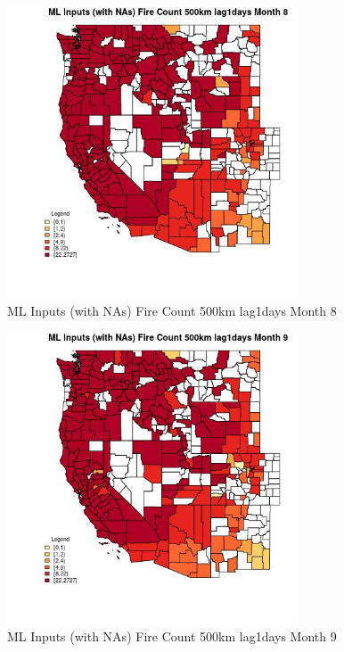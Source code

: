 \begin{figure} 
\centering  
\includegraphics[width=0.77\textwidth]{Code_Outputs/Report_ML_input_PM25_Step4_part_f_de_duplicated_aves_prioritize_24hr_obswNAs_CountyFire_Count_500km_lag1daysmedianMonth8.jpg} 
\caption{\label{fig:Report_ML_input_PM25_Step4_part_f_de_duplicated_aves_prioritize_24hr_obswNAsCountyFire_Count_500km_lag1daysmedianMonth8}ML Inputs (with NAs) Fire Count 500km lag1days Month 8} 
\end{figure} 
 

\begin{figure} 
\centering  
\includegraphics[width=0.77\textwidth]{Code_Outputs/Report_ML_input_PM25_Step4_part_f_de_duplicated_aves_prioritize_24hr_obswNAs_CountyFire_Count_500km_lag1daysmedianMonth9.jpg} 
\caption{\label{fig:Report_ML_input_PM25_Step4_part_f_de_duplicated_aves_prioritize_24hr_obswNAsCountyFire_Count_500km_lag1daysmedianMonth9}ML Inputs (with NAs) Fire Count 500km lag1days Month 9} 
\end{figure} 
 

